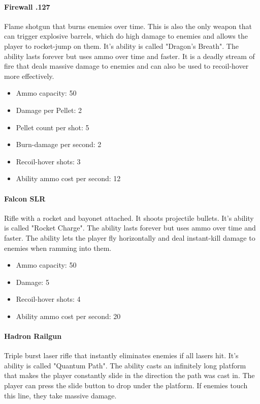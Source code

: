\documentclass[../Main.tex]{subfiles}
\begin{document}
\paragraph{Firewall .127}

Flame shotgun that burns enemies over time. This is also the only weapon that can trigger explosive barrels, which do high damage to enemies and allows the player to rocket-jump on them. It's ability is called "Dragon's Breath". The ability lasts forever but uses ammo over time and faster. It is a deadly stream of fire that deals massive damage to enemies and can also be used to recoil-hover more effectively.

\begin{itemize}
	\item Ammo capacity: 50
	\item Damage per Pellet: 2
	\item Pellet count per shot: 5
	\item Burn-damage per second: 2
	\item Recoil-hover shots: 3
	\item Ability ammo cost per second: 12
\end{itemize} 

\paragraph{Falcon SLR}

Rifle with a rocket and bayonet attached. It shoots projectile bullets. It's ability is called "Rocket Charge". The ability lasts forever but uses ammo over time and faster. The ability lets the player fly horizontally and deal instant-kill damage to enemies when ramming into them.

\begin{itemize}
	\item Ammo capacity: 50
	\item Damage: 5
	\item Recoil-hover shots: 4
	\item Ability ammo cost per second: 20
\end{itemize} 


\paragraph{Hadron Railgun}

Triple burst laser rifle that instantly eliminates enemies if all lasers hit. It's ability is called "Quantum Path". The ability casts an infinitely long platform that makes the player constantly slide in the direction the path was cast in. The player can press the slide button to drop under the platform. If enemies touch this line, they take massive damage. 
\end{document}

